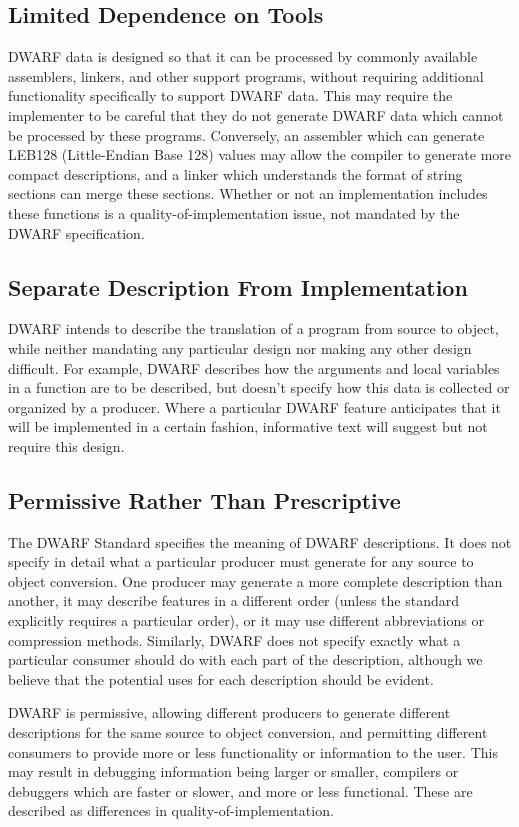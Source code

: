 \subsection{Limited Dependence on Tools}
DWARF data is designed so that it can be processed by commonly
available assemblers, linkers, and other support programs,
without requiring additional functionality specifically to
support DWARF data.  This may require the implementer to be
careful that they do not generate DWARF data which cannot be
processed by these programs.  Conversely, an assembler which
can generate LEB128 (Little-Endian Base 128)
values may allow the compiler to generate
more compact descriptions, and a linker which understands the
format of string sections can merge these sections.  Whether
or not an implementation includes these functions is a
quality-of-implementation issue, not mandated by the DWARF
specification.

\subsection{Separate Description From Implementation}
DWARF intends to describe the translation of a program from
source to object, while neither mandating any particular design
nor making any other design difficult.  For example, DWARF
describes how the arguments and local variables in a function
are to be described, but doesn't specify how this data is
collected or organized by a producer.  Where a particular DWARF
feature anticipates that it will be implemented in a certain
fashion, informative text will suggest but not require this design.

\subsection{Permissive Rather Than Prescriptive}
The DWARF Standard specifies the meaning of DWARF descriptions. It does not
specify in detail what a particular producer must generate for any source to
object conversion.  One producer may generate a more complete description
than another, it may describe features in a different order (unless the
standard explicitly requires a particular order), or it may use
different abbreviations or compression methods.  Similarly, DWARF does not
specify exactly what a particular consumer should do with each part of the
description, although we believe that the potential uses for each description
should be evident.

DWARF is permissive, allowing different producers to generate different
descriptions for the same source to object conversion, and permitting
different consumers to provide more or less functionality or information
to the user.  This may result in debugging information being larger or
smaller, compilers or debuggers which are faster or slower, and more or
less functional.  These are described as differences in
quality-of-implementation.

